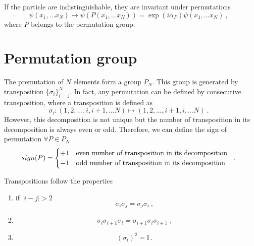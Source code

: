     If the particle are indistinguishable, they are invariant under permutations
    \begin{equation*}\label{perm}
        \psi(x_1, \ldots x_N) \mapsto \psi(P(x_1, \ldots x_N)) = \exp(i \alpha_P) \psi (x_1, \ldots x_N) ~,
    \end{equation*}
    where $P$ belongs to the permutation group.

\chapter{Permutation group}

    The premutation of $N$ elements form a group $P_N$. This group is generated by transposition $\{\sigma_i\}_{i=1}^N$. In fact, any permutation can be defined by consecutive transposition, where a transposition is defined as 
    \begin{equation*}
        \sigma_i \colon (1,2,\ldots, i, i+1, \ldots N) \mapsto (1,2,\ldots, i+1, i, \ldots N) ~.
    \end{equation*}
    However, this decomposition is not unique but the number of transposition in its decomposition is always even or odd. Therefore, we can define the sign of permutation $\forall P \in P_N$
    \begin{equation*}
        sign(P) = \begin{cases}
            + 1 & \textnormal{even number of transposition in its decomposition } \\
            - 1 & \textnormal{odd number of transposition in its decomposition } \\
        \end{cases} ~.
    \end{equation*}

    Transpositions follow the properties 
    \begin{enumerate}
        \item if $|i - j| > 2$ \begin{equation}\label{prop1}
            \sigma_i \sigma_j = \sigma_j \sigma_i ~,
        \end{equation} 
        \item \begin{equation}\label{prop2}
            \sigma_i \sigma_{i+1} \sigma_i = \sigma_{i+1} \sigma_i \sigma_{i+1} ~,
        \end{equation}
        \item \begin{equation}\label{prop3}
            (\sigma_i)^2 = \mathbb I ~.
        \end{equation}
    \end{enumerate}

